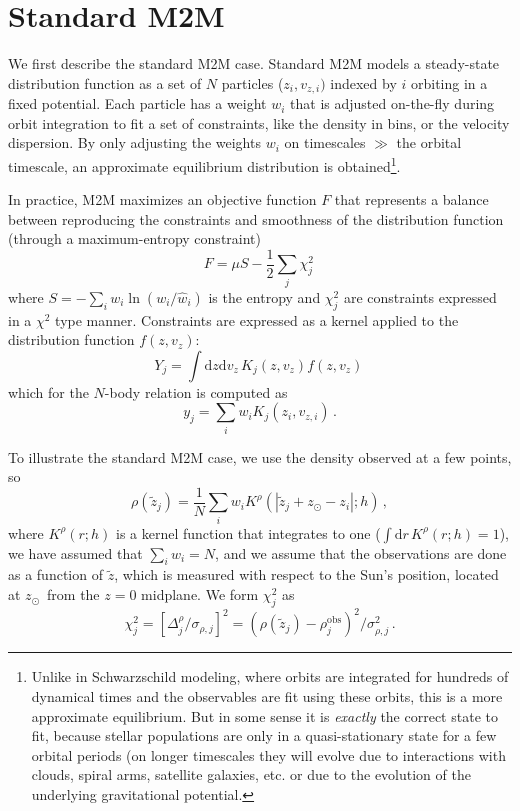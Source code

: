 \documentclass[12pt,preprint]{aastex}
\newcommand{\dd}{\mathrm{d}}
\newcommand{\zsun}{\ensuremath{z_\odot}}
\newcommand{\vz}{\ensuremath{v_z}}
\newcommand{\vzi}{\ensuremath{v_{z,i}}}
\newcommand{\zi}{\ensuremath{z_i}}
\newcommand{\wi}{\ensuremath{w_i}}
\newcommand{\zobs}{\ensuremath{\tilde{z}}}
\begin{document}
\section{Standard M2M}

We first describe the standard M2M case. Standard M2M models a
steady-state distribution function as a set of $N$ particles
($\zi,\vzi)$ indexed by $i$ orbiting in a fixed potential. Each
particle has a weight $\wi$ that is adjusted on-the-fly during orbit
integration to fit a set of constraints, like the density in bins, or
the velocity dispersion. By only adjusting the weights $\wi$ on
timescales $\gg$ the orbital timescale, an approximate equilibrium
distribution is obtained\footnote{Unlike in Schwarzschild modeling,
  where orbits are integrated for hundreds of dynamical times and the
  observables are fit using these orbits, this is a more approximate
  equilibrium. But in some sense it is \emph{exactly} the correct
  state to fit, because stellar populations are only in a
  quasi-stationary state for a few orbital periods (on longer
  timescales they will evolve due to interactions with clouds, spiral
  arms, satellite galaxies, etc. or due to the evolution of the
  underlying gravitational potential.}.

In practice, M2M maximizes an objective function $F$ that represents a
balance between reproducing the constraints and smoothness of the
distribution function (through a maximum-entropy constraint)
\begin{equation}
  F = \mu S - \frac{1}{2}\sum_j \chi^2_j\,
\end{equation}
where $S = - \sum_i w_i \ln\left(w_i/\hat{w}_i\right)$ is the entropy
and $\chi_j^2$ are constraints expressed in a $\chi^2$ type
manner. Constraints are expressed as a kernel applied to the
distribution function $f(z,\vz)$:
\begin{equation}
  Y_j = \int \dd z\dd \vz \,K_j(z,\vz) f(z,\vz)\,
\end{equation}
which for the $N$-body relation is computed as
\begin{equation}
  y_j = \sum_i \wi K_j(\zi,\vzi)\,.
\end{equation}

To illustrate the standard M2M case, we use the density observed at a
few points, so
\begin{equation}
  \rho(\zobs_j) = \frac{1}{N}\sum_i \wi K^\rho(|\zobs_j+\zsun - \zi|;h)\,,
\end{equation}
where $K^\rho(r;h)$ is a kernel function that integrates to one ($\int
\dd r\,K^\rho(r;h) = 1$), we have assumed that $\sum_i \wi = N$, and
we assume that the observations are done as a function of $\zobs$,
which is measured with respect to the Sun's position, located at \zsun\
from the $z=0$ midplane. We form $\chi^2_j$ as
\begin{equation}
  \chi_j^2 = [\Delta^\rho_j/\sigma_{\rho,j}]^2 = \left( \rho(\zobs_j)-\rho^\mathrm{obs}_j\right)^2/\sigma_{\rho,j}^2\,.
\end{equation}
\end{document}
